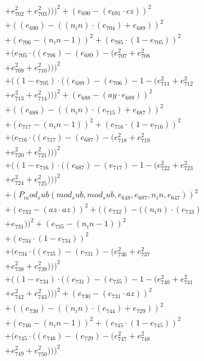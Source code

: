 \documentclass[10pt, a4paper]{article}
\begin{document}
\begin{small}
\begin{align*}
& + e_{702}^{2} + e_{703}^{2})))^{2} + (e_{690} - (e_{691}  \cdot  cz))^{2} \\
& + ((e_{690}) - ((n_in)  \cdot  (e_{704}) + e_{689}))^{2} \\
& + (e_{706} - (n_in - 1))^{2} + (e_{705}  \cdot  (1 - e_{705}))^{2} \\
& + (e_{705}  \cdot  ((e_{706}) - (e_{689}) - (e_{707}^{2} + e_{708}^{2} \\
& + e_{709}^{2} + e_{710}^{2})))^{2} \\
& + ((1 - e_{705})  \cdot  ((e_{689}) - (e_{706}) - 1 - (e_{711}^{2} + e_{712}^{2} \\
& + e_{713}^{2} + e_{714}^{2})))^{2} + (e_{688} - (ay  \cdot  e_{689}))^{2} \\
& + ((e_{688}) - ((n_in)  \cdot  (e_{715}) + e_{687}))^{2} \\
& + (e_{717} - (n_in - 1))^{2} + (e_{716}  \cdot  (1 - e_{716}))^{2} \\
& + (e_{716}  \cdot  ((e_{717}) - (e_{687}) - (e_{718}^{2} + e_{719}^{2} \\
& + e_{720}^{2} + e_{721}^{2})))^{2} \\
& + ((1 - e_{716})  \cdot  ((e_{687}) - (e_{717}) - 1 - (e_{722}^{2} + e_{723}^{2} \\
& + e_{724}^{2} + e_{725}^{2})))^{2} \\
& + (P_mod_sub(mod_sub, mod_sub, e_{648}, e_{687}, n_in, e_{647}))^{2} \\
& + (e_{732} - (az  \cdot  az))^{2} + ((e_{732}) - ((n_in)  \cdot  (e_{733}) \\
& + e_{731}))^{2} + (e_{735} - (n_in - 1))^{2} \\
& + (e_{734}  \cdot  (1 - e_{734}))^{2} \\
& + (e_{734}  \cdot  ((e_{735}) - (e_{731}) - (e_{736}^{2} + e_{737}^{2} \\
& + e_{738}^{2} + e_{739}^{2})))^{2} \\
& + ((1 - e_{734})  \cdot  ((e_{731}) - (e_{735}) - 1 - (e_{740}^{2} + e_{741}^{2} \\
& + e_{742}^{2} + e_{743}^{2})))^{2} + (e_{730} - (e_{731}  \cdot  az))^{2} \\
& + ((e_{730}) - ((n_in)  \cdot  (e_{744}) + e_{729}))^{2} \\
& + (e_{746} - (n_in - 1))^{2} + (e_{745}  \cdot  (1 - e_{745}))^{2} \\
& + (e_{745}  \cdot  ((e_{746}) - (e_{729}) - (e_{747}^{2} + e_{748}^{2} \\
& + e_{749}^{2} + e_{750}^{2})))^{2} \\

\end{align*}
\end{small}
\end{document}
